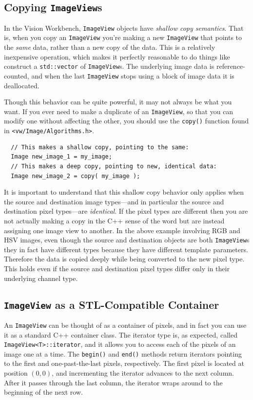\subsection{Copying {\tt ImageView}s}

In the Vision Workbench, \verb#ImageView# objects have {\it shallow
copy semantics}.  That is, when you copy an \verb#ImageView# you're
making a new \verb#ImageView# that points to the {\it same} data,
rather than a new copy of the data.  This is a relatively inexpensive
operation, which makes it perfectly reasonable to do things like
construct a \verb#std::vector# of \verb#ImageView#s.  The underlying
image data is reference-counted, and when the last \verb#ImageView#
stops using a block of image data it is deallocated.

Though this behavior can be quite powerful, it may not always be
what you want.  If you ever need to make a duplicate of an
\verb#ImageView#, so that you can modify one without affecting the
other, you should use the \verb#copy()# function found in
\verb#<vw/Image/Algorithms.h>#.
\begin{verbatim}
  // This makes a shallow copy, pointing to the same:
  Image new_image_1 = my_image;
  // This makes a deep copy, pointing to new, identical data:
  Image new_image_2 = copy( my_image );
\end{verbatim}

It is important to understand that this shallow copy behavior only
applies when the source and destination image types---and in particular
the source and destination pixel types---are {\it identical}.  If the
pixel types are different then you are not actually making a copy in
the C++ sense of the word but are instead assigning one image view to
another.  In the above example involving RGB and HSV images, even
though the source and destination objects are both \verb#ImageView#s
they in fact have different types because they have different template
parameters.  Therefore the data is copied deeply while being converted
to the new pixel type.  This holds even if the source and destination
pixel types differ only in their underlying channel type.

\subsection{{\tt ImageView} as a STL-Compatible Container}

An \verb#ImageView# can be thought of as a container of pixels, and in
fact you can use it as a standard C++ container class.  The iterator
type is, as expected, called \verb#ImageView<T>::iterator#, and it
allows you to access each of the pixels of an image one at a time.
The \verb#begin()# and \verb#end()# methods return iterators pointing
to the first and one-past-the-last pixels, respectively.  The first
pixel is located at position $(0,0)$, and incrementing the iterator
advances to the next column.  After it passes through the last column,
the iterator wraps around to the beginning of the next row.

